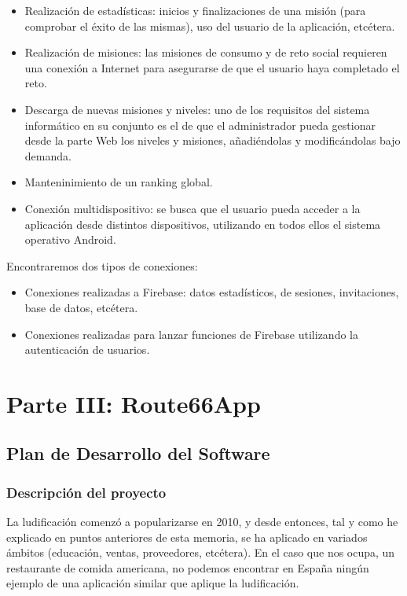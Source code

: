 \documentclass[twoside]{report}
\begin{document}
\begin{itemize}
\item Realización de estadísticas: inicios y finalizaciones de una misión (para comprobar el éxito de las mismas), uso del usuario de la aplicación, etcétera.

\item Realización de misiones: las misiones de consumo y de reto social requieren una conexión a Internet para asegurarse de que el usuario haya completado el reto.

\item Descarga de nuevas misiones y niveles: uno de los requisitos del sistema informático en su conjunto es el de que el administrador pueda gestionar desde la parte Web los niveles y misiones, añadiéndolas y modificándolas bajo demanda.

\item Manteninimiento de un ranking global.

\item Conexión multidispositivo: se busca que el usuario pueda acceder a la aplicación desde distintos dispositivos, utilizando en todos ellos el sistema operativo Android.
\end{itemize}

Encontraremos dos tipos de conexiones:

\begin{itemize}
\item Conexiones realizadas a Firebase: datos estadísticos, de sesiones, invitaciones, base de datos, etcétera.

\item Conexiones realizadas para lanzar funciones de Firebase utilizando la autenticación de usuarios.

\end{itemize}


\chapter{Parte III: Route66App}
\section{Plan de Desarrollo del Software}
\subsection{Descripción del proyecto}

La ludificación comenzó a popularizarse en 2010\cite{anatfg}, y desde entonces, tal y como he explicado en puntos anteriores de esta memoria, se ha aplicado en variados ámbitos (educación, ventas, proveedores, etcétera). En el caso que nos ocupa, un restaurante de comida americana, no podemos encontrar en España ningún ejemplo de una aplicación similar que aplique la ludificación.
\end{document}
